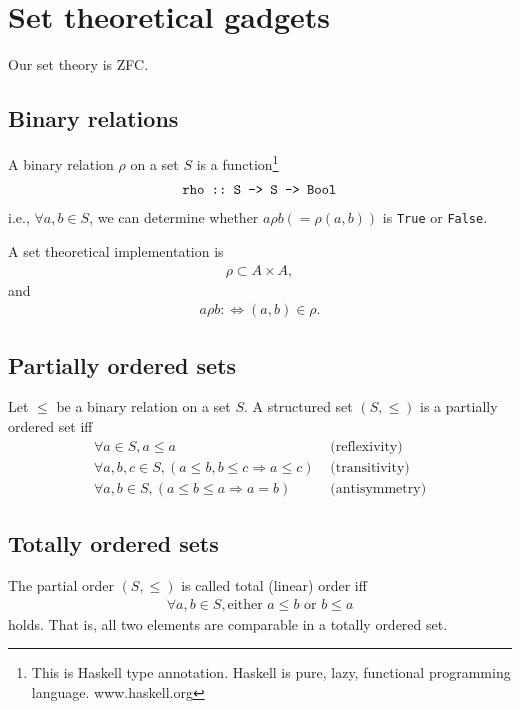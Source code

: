 \documentclass[11pt]{book}
\begin{document}
\section{Set theoretical gadgets}
Our set theory is ZFC.


\subsection{Binary relations}
A binary relation $\rho$ on a set $S$ is a function\footnote{This is Haskell type annotation. Haskell is pure, lazy, functional programming language. www.haskell.org}
\begin{eqnarray}
\verb|rho :: S -> S -> Bool|
\end{eqnarray}
i.e., $\forall a,b \in S$, we can determine whether $a \rho b \left( = \rho(a,b) \right)$ is \verb|True| or \verb|False|.

A set theoretical implementation is
\begin{eqnarray}
\rho \subset A \times A,
\end{eqnarray}
and
\begin{eqnarray}
a \rho b :\Leftrightarrow (a,b) \in \rho.
\end{eqnarray}


\subsection{Partially ordered sets}
Let $\leq$ be a binary relation on a set $S$.
A structured set $(S, \leq)$ is a partially ordered set iff
\begin{eqnarray}
\forall a \in S, a \leq a & \text{ (reflexivity)} \\
\forall a,b,c \in S, (a \leq b, b \leq c \Rightarrow a \leq c) & \text{ (transitivity)} \\
\forall a,b \in S, (a \leq b \leq a \Rightarrow a = b) & \text{ (antisymmetry)}
\end{eqnarray}

\subsection{Totally ordered sets}
The partial order $(S, \leq)$ is called total (linear) order iff
\begin{eqnarray}
\forall a,b \in S, \text{either } a \leq b \text{ or } b \leq a
\end{eqnarray}
holds.
That is, all two elements are comparable in a totally ordered set.
\end{document}
